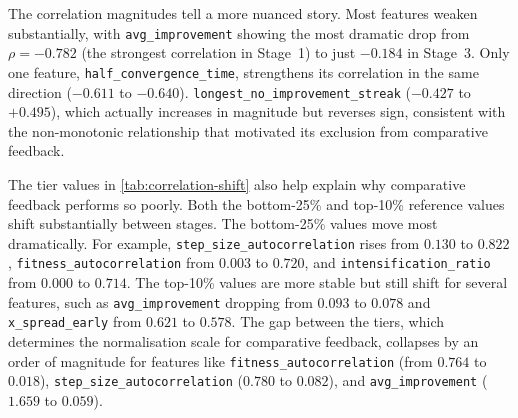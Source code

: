 The correlation magnitudes tell a more nuanced story. Most features weaken substantially, with \texttt{avg\_improvement} showing the most dramatic drop from $\rho = -0.782$ (the strongest correlation in Stage~1) to just $-0.184$ in Stage~3. Only one feature, \texttt{half\_convergence\_time}, strengthens its correlation in the same direction ($-0.611$ to $-0.640$). \texttt{longest\_no\_improvement\_streak} ($-0.427$ to $+0.495$), which actually increases in magnitude but reverses sign, consistent with the non-monotonic relationship that motivated its exclusion from comparative feedback.

The tier values in \cref{tab:correlation-shift} also help explain why comparative feedback performs so poorly. Both the bottom-25\% and top-10\% reference values shift substantially between stages. The bottom-25\% values move most dramatically. For example, \texttt{step\_size\_autocorrelation} rises from $0.130$ to $0.822$, \texttt{fitness\_autocorrelation} from $0.003$ to $0.720$, and \texttt{intensification\_ratio} from $0.000$ to $0.714$. The top-10\% values are more stable but still shift for several features, such as \texttt{avg\_improvement} dropping from $0.093$ to $0.078$ and \texttt{x\_spread\_early} from $0.621$ to $0.578$. The gap between the tiers, which determines the normalisation scale for comparative feedback, collapses by an order of magnitude for features like \texttt{fitness\_autocorrelation} (from $0.764$ to $0.018$), \texttt{step\_size\_autocorrelation} ($0.780$ to $0.082$), and \texttt{avg\_improvement} ($1.659$ to $0.059$).